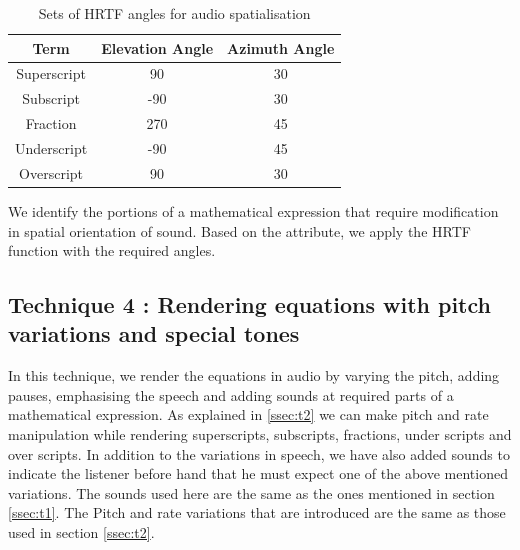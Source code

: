 \documentclass{article}
\begin{document}
\begin{table}[h]
\caption{Sets of HRTF angles for audio spatialisation}

\vspace{8pt} %

\centering
\begin{tabular}{| c | c | c |}
\hline%
Term & Elevation Angle & Azimuth Angle \\[0.5ex]
\hline
Superscript & 90 & 30  \\
Subscript & -90 & 30  \\
Fraction & 270 & 45  \\
Underscript & -90 & 45  \\
Overscript & 90 & 30\\ %
\hline


\end{tabular}
\label{table:hrtf}
\end{table}


We identify the portions of a mathematical expression that require modification in spatial orientation of sound. Based on the attribute, we apply the HRTF function with the required angles.


\subsection{Technique 4 : Rendering equations with pitch variations and special tones}
\label{ssec:t4}


In this technique, we render the equations in audio by varying the pitch, adding pauses, emphasising the speech and adding sounds at required parts of a mathematical expression. As explained in \ref{ssec:t2} we can make pitch and rate manipulation while rendering superscripts, subscripts, fractions, under scripts and over scripts. In addition to the variations in speech, we have also added sounds to indicate the listener before hand that he must expect one of the above mentioned variations. The sounds used here are the same as the ones mentioned in section \ref{ssec:t1}.
The Pitch and rate variations that are introduced are the same as those used in section \ref{ssec:t2}.
\end{document}
